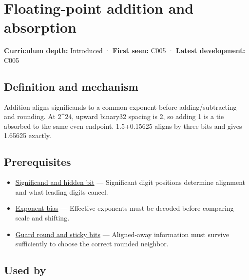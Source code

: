 \hypertarget{appendix-a1b1b4580dfd}{}\label{referencestart:appendix-a1b1b4580dfd}
\section{Floating-point addition and absorption}\label{appendix-a1b1b4580dfd-floating-point-addition-and-absorption}

\textbf{Curriculum depth:} Introduced · \textbf{First seen:} C005 · \textbf{Latest development:} C005

\begin{allmightroledefinition}

\subsection{Definition and mechanism}\label{appendix-a1b1b4580dfd-definition-and-mechanism}

Addition aligns significands to a common exponent before adding/subtracting and rounding. At 2\^{}24, upward binary32 spacing is 2, so adding 1 is a tie absorbed to the same even endpoint. 1.5+0.15625 aligns by three bits and gives 1.65625 exactly.

\end{allmightroledefinition}

\subsection{Prerequisites}\label{appendix-a1b1b4580dfd-prerequisites}

\begin{itemize}
\tightlist
\item
  \hyperref[appendix-a24fd710cf67]{Significand and hidden bit} --- Significant digit positions determine alignment and what leading digits cancel.
\item
  \hyperref[appendix-2fae058c82e1]{Exponent bias} --- Effective exponents must be decoded before comparing scale and shifting.
\item
  \hyperref[appendix-b572b631069b]{Guard round and sticky bits} --- Aligned-away information must survive sufficiently to choose the correct rounded neighbor.
\end{itemize}

\subsection{Used by}\label{appendix-a1b1b4580dfd-used-by}

